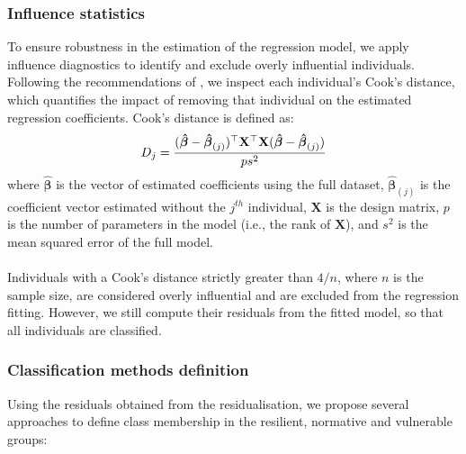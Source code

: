 \documentclass[12pt]{article}
\begin{document}
\subsubsection{Influence statistics}
To ensure robustness in the estimation of the regression model, we apply influence diagnostics to identify and exclude overly influential individuals. Following the recommendations of \cite{influencial_stat_residuals}, we inspect each individual's Cook's distance, which quantifies the impact of removing that individual on the estimated regression coefficients. Cook's distance is defined as:
\[
D_j = \frac{(\boldsymbol{\hat\beta} - \boldsymbol{\hat\beta}_{(j)})^\top \mathbf{X}^\top \mathbf{X} (\boldsymbol{\hat\beta} - \boldsymbol{\hat\beta}_{(j)})}{p s^2}\\
\]
where \( \boldsymbol{\hat\beta} \) is the vector of estimated coefficients using the full dataset, \( \boldsymbol{\hat\beta}_{(j)} \) is the coefficient vector estimated without the $j^{th}$ individual, \( \mathbf{X} \) is the design matrix, \( p \) is the number of parameters in the model (i.e., the rank of \( \mathbf{X} \)), and \( s^2 \) is the mean squared error of the full model.\\
\\
Individuals with a Cook’s distance strictly greater than \( 4/n \), where \( n \) is the sample size, are considered overly influential and are excluded from the regression fitting. However, we still compute their residuals from the fitted model, so that all individuals are classified. 

\subsubsection{Classification methods definition}
Using the residuals obtained from the residualisation, we propose several approaches to define class membership in the resilient, normative and vulnerable groups:
\end{document}
